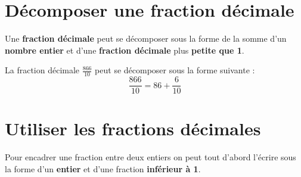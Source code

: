 \begin{pageCours}
\section{Décomposer une fraction décimale}


\begin{Def}
Une \textbf{fraction décimale} peut se décomposer sous la forme de la somme d'un \textbf{nombre entier} et d'une \textbf{fraction décimale} plus \textbf{petite que 1}.
\end{Def}

\begin{Ex}
La fraction décimale $\frac{866}{10}$ peut se décomposer sous la forme suivante :
\[\frac{866}{10}=86+\frac{6}{10}\]
\end{Ex}


\section{Utiliser les fractions décimales}

\begin{Mt}
Pour encadrer une fraction entre deux entiers on peut tout d'abord l'écrire sous la forme d'un \textbf{entier} et d'une fraction \textbf{inférieur à 1}.
\end{Mt}



\end{pageCours}
